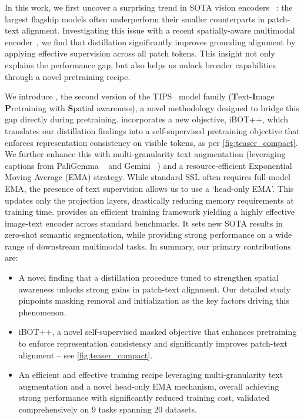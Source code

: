 In this work, we first uncover a surprising trend in SOTA vision encoders ~\citep{tips_paper, tschannen2025siglip2multilingualvisionlanguage}: the largest flagship models often underperform their smaller counterparts in patch-text alignment. 
Investigating this issue with a recent spatially-aware multimodal encoder~\citep{tips_paper}, we find that distillation significantly improves grounding alignment by applying effective supervision across all patch tokens. 
This insight not only explains the performance gap, but also helps us unlock broader capabilities through a novel pretraining recipe. 

We introduce \textbf{\tipsvtwo}, the second version of the TIPS~\cite{tips_paper} model family (\textbf{T}ext-\textbf{I}mage \textbf{P}retraining with \textbf{S}patial awareness), a novel methodology designed to bridge this gap directly during pretraining.
\tipsvtwo incorporates a new objective, iBOT++, which translates our distillation findings into a self-supervised pretraining objective that enforces representation consistency on visible tokens, as per \cref{fig:teaser_compact}. 
We further enhance this with multi-granularity text augmentation (leveraging captions from PaliGemma ~\citep{beyer2024paligemma} and Gemini ~\citep{geminiteam2024gemini}) and a resource-efficient Exponential Moving Average (EMA) strategy. 
While standard SSL often requires full-model EMA, the presence of text supervision allows us to use a `head-only EMA'.
This updates only the projection layers, drastically reducing memory requirements at training time.
\tipsvtwo provides an efficient training framework yielding a highly effective image-text encoder across standard benchmarks. 
It sets new SOTA results in zero-shot semantic segmentation, while providing strong performance on a wide range of downstream multimodal tasks.
In summary, our primary contributions are:
\begin{itemize}
\item A novel finding that a distillation procedure tuned to strengthen spatial awareness unlocks strong gains in patch-text alignment.
Our detailed study pinpoints masking removal and initialization as the key factors driving this phenomenon.
\item iBOT++, a novel self-supervised masked objective that enhances pretraining to enforce representation consistency and significantly improves patch-text alignment -- see \cref{fig:teaser_compact}.
\item An efficient and effective training recipe leveraging multi-granularity text augmentation and a novel head-only EMA mechanism, overall achieving strong performance with significantly reduced training cost, validated comprehensively on 9 tasks spanning 20 datasets. 

\end{itemize}

